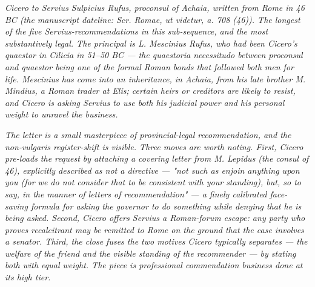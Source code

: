
\textit{Cicero to Servius Sulpicius Rufus, proconsul of
Achaia, written from Rome in 46 BC (the manuscript
dateline: \textit{Scr. Romae, ut videtur, a. 708 (46)}).
The longest of the five Servius-recommendations in this
sub-sequence, and the most substantively legal. The
principal is L. Mescinius Rufus, who had been Cicero's
quaestor in Cilicia in 51--50 BC --- the
\textit{quaestoria necessitudo} between proconsul and
quaestor being one of the formal Roman bonds that
followed both men for life. Mescinius has come into an
inheritance, in Achaia, from his late brother M. Mindius,
a Roman trader at Elis; certain heirs or creditors are
likely to resist, and Cicero is asking Servius to use
both his judicial power and his personal weight to
unravel the business.}

\textit{The letter is a small masterpiece of
provincial-legal recommendation, and the
\textit{non-vulgaris} register-shift is visible. Three
moves are worth noting. First, Cicero pre-loads the
request by attaching a covering letter from M. Lepidus
(the consul of 46), explicitly described as not a
directive --- "not such as enjoin anything upon you (for
we do not consider that to be consistent with your
standing), but, so to say, in the manner of letters of
recommendation" --- a finely calibrated face-saving
formula for asking the governor to do something while
denying that he is being asked. Second, Cicero offers
Servius a Roman-forum escape: any party who proves
recalcitrant may be remitted to Rome on the ground that
the case involves a senator. Third, the close fuses the
two motives Cicero typically separates --- the welfare
of the friend and the visible standing of the
recommender --- by stating both with equal weight. The
piece is professional commendation business done at its
high tier.}
